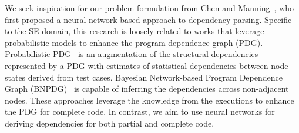 We seek inspiration for our problem formulation from Chen and Manning~\cite{chen-manning-2014-fast}, who first proposed a neural network-based approach to dependency parsing. 
Specific to the SE domain, this research is loosely related to works that leverage probabilistic models to enhance the program dependence graph (PDG).
Probabilistic PDG~\cite{baah-issta08-probabilistic} is an augmentation of the structural dependencies represented by a PDG with estimates of statistical dependencies between node states derived from test cases. 
Bayesian Network-based Program Dependence Graph (BNPDG)~\cite{yu-jss17-bayesian} is capable of inferring the dependencies across non-adjacent nodes. 
These approaches leverage the knowledge from the executions to enhance the PDG for complete code. In contrast, we aim to use neural networks for deriving dependencies for both partial and complete code.

